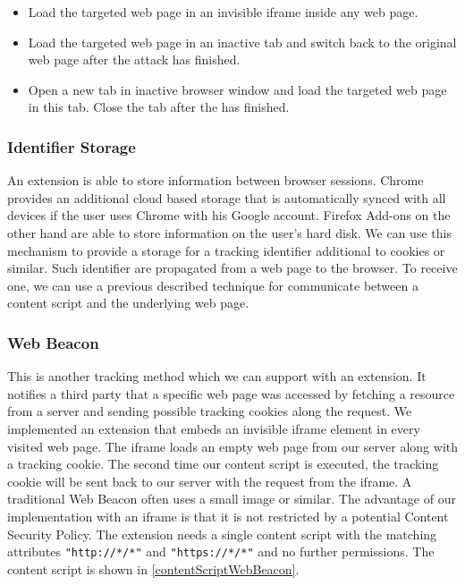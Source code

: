 			\begin{itemize}
				\itemsep-0.3em
				\item Load the targeted web page in an invisible iframe inside any web page.
				\item Load the targeted web page in an inactive tab and switch back to the original web page after the attack has finished.
				\item Open a new tab in inactive browser window and load the targeted web page in this tab. Close the tab after the has finished.
			\end{itemize} 
		
		\subsubsection{Identifier Storage} 
			
			An extension is able to store information between browser sessions. Chrome provides an additional cloud based storage that is automatically synced with all devices if the user uses Chrome with his Google account. Firefox Add-ons on the other hand are able to store information on the user's hard disk. We can use this mechanism to provide a storage for a tracking identifier additional to cookies or similar. Such identifier are propagated from a web page to the browser. To receive one, we can use a previous described technique for communicate between a content script and the underlying web page. \\ %
		
		\subsubsection{Web Beacon}
		
			This is another tracking method which we can support with an extension. It notifies a third party that a specific web page was accessed by fetching a resource from a server and sending possible tracking cookies along the request. We implemented an extension that embeds an invisible iframe element in every visited web page. The iframe loads an empty web page from our server along with a tracking cookie. The second time our content script is executed, the tracking cookie will be sent back to our server with the request from the iframe. A traditional Web Beacon often uses a small image or similar. The advantage of our implementation with an iframe is that it is not restricted by a potential Content Security Policy. The extension needs a single content script with the matching attributes \texttt{"http://*/*"} and \texttt{"https://*/*"} and no further permissions. The content script is shown in \autoref{contentScriptWebBeacon}.
			
